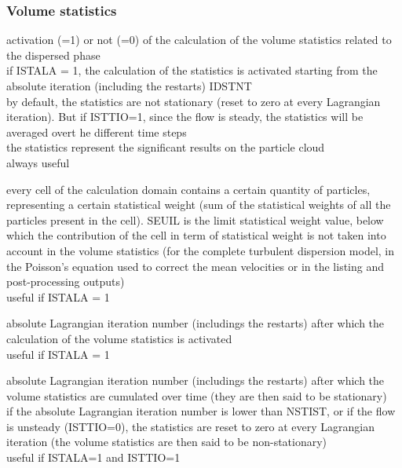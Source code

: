 \subsubsection{Volume statistics}

{activation (=1) or not (=0) of the calculation of the volume
statistics related to the dispersed phase\\
if ISTALA = 1, the calculation of the statistics is activated starting from the
absolute iteration (including the restarts) IDSTNT\\
by default, the statistics are not stationary (reset to zero at every
Lagrangian iteration). But if ISTTIO=1, since the flow is steady, the statistics
will be averaged overt he different time steps\\
the statistics represent the significant results on the particle cloud\\
always useful}

{every cell of the calculation domain contains a certain quantity of
particles, representing a certain statistical weight (sum of the
statistical weights of all the particles present in the cell). SEUIL is
the limit statistical weight value, below which the contribution of the
cell in term of statistical weight is not taken into account in the volume
statistics (for the complete turbulent dispersion model, in the
Poisson's equation used to correct the mean velocities or in the listing and
post-processing outputs)\\
useful if ISTALA = 1}

{absolute Lagrangian iteration number (includings the restarts) after
which the calculation of the volume statistics is activated\\
useful if ISTALA = 1}

{absolute Lagrangian iteration number (includings the restarts) after
which the volume statistics are cumulated over time (they are then said to be
stationary)\\
if the absolute Lagrangian iteration number is lower than NSTIST, or if the flow
is unsteady (ISTTIO=0), the statistics are reset to zero at every Lagrangian
iteration (the volume statistics are then said to be non-stationary)\\
useful if ISTALA=1 and ISTTIO=1}

